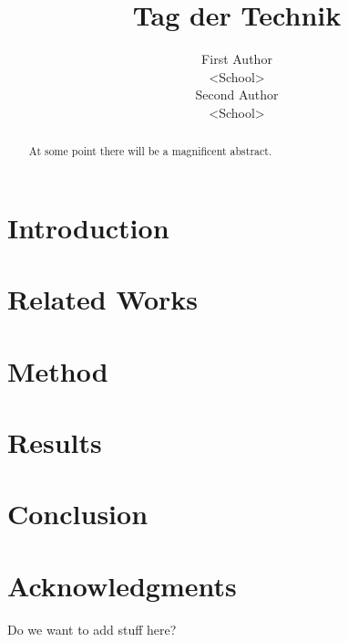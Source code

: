 \documentclass[11pt]{article}
\title{Tag der Technik}
\author{First Author\\
  <School> \\\And
  Second Author \\
  <School> \\}
\begin{document}
\maketitle
\begin{abstract}
At some point there will be a magnificent abstract.
\end{abstract}

\section{Introduction}

\section{Related Works}
\cite{vaswani17}

\section{Method}

\section{Results}

\section{Conclusion}

\section*{Acknowledgments}
Do we want to add stuff here?


\end{document}

